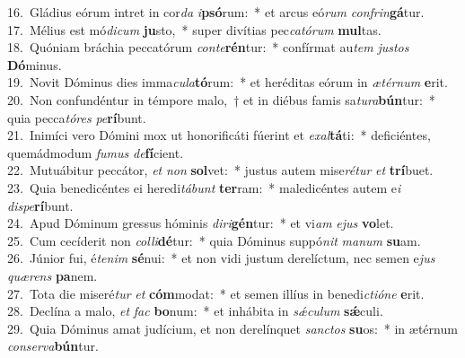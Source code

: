 {16.~}Gládius eórum intret in cor\textit{da} \textit{i}\textbf{psó}rum:~* et arcus eó\textit{rum} \textit{con}\textit{frin}\textbf{gá}tur.\\
{17.~}Mélius est mó\textit{di}\textit{cum} \textbf{ju}sto,~* super divítias pec\textit{ca}\textit{tó}\textit{rum} \textbf{mul}tas.\\
{18.~}Quóniam bráchia peccatórum \textit{con}\textit{te}\textbf{rén}tur:~* confírmat au\textit{tem} \textit{ju}\textit{stos} \textbf{Dó}minus.\\
{19.~}Novit Dóminus dies imma\textit{cu}\textit{la}\textbf{tó}rum:~* et heréditas eórum in \textit{æ}\textit{tér}\textit{num} \textbf{e}rit.\\
{20.~}Non confundéntur in témpore malo,~† et in diébus famis sa\textit{tu}\textit{ra}\textbf{bún}tur:~* quia pecca\textit{tó}\textit{res} \textit{pe}\textbf{rí}bunt.\\
{21.~}Inimíci vero Dómini mox ut honorificáti fúerint et \textit{e}\textit{xal}\textbf{tá}ti:~* deficiéntes, quemádmodum \textit{fu}\textit{mus} \textit{de}\textbf{fí}cient.\\
{22.~}Mutuábitur peccátor, \textit{et} \textit{non} \textbf{sol}vet:~* justus autem mise\textit{ré}\textit{tur} \textit{et} \textbf{trí}buet.\\
{23.~}Quia benedicéntes ei heredi\textit{tá}\textit{bunt} \textbf{ter}ram:~* maledicéntes autem e\textit{i} \textit{di}\textit{spe}\textbf{rí}bunt.\\
{24.~}Apud Dóminum gressus hóminis \textit{di}\textit{ri}\textbf{gén}tur:~* et vi\textit{am} \textit{e}\textit{jus} \textbf{vo}let.\\
{25.~}Cum cecíderit non \textit{col}\textit{li}\textbf{dé}tur:~* quia Dóminus suppó\textit{nit} \textit{ma}\textit{num} \textbf{su}am.\\
{26.~}Júnior fui, é\textit{te}\textit{nim} \textbf{sé}nui:~* et non vidi justum derelíctum, nec semen e\textit{jus} \textit{quæ}\textit{rens} \textbf{pa}nem.\\
{27.~}Tota die miseré\textit{tur} \textit{et} \textbf{cóm}modat:~* et semen illíus in benedi\textit{cti}\textit{ó}\textit{ne} \textbf{e}rit.\\
{28.~}Declína a malo, \textit{et} \textit{fac} \textbf{bo}num:~* et inhábita in \textit{sǽ}\textit{cu}\textit{lum} \textbf{sǽ}culi.\\
{29.~}Quia Dóminus amat judícium, et non derelínquet \textit{san}\textit{ctos} \textbf{su}os:~* in ætérnum \textit{con}\textit{ser}\textit{va}\textbf{bún}tur.\\
